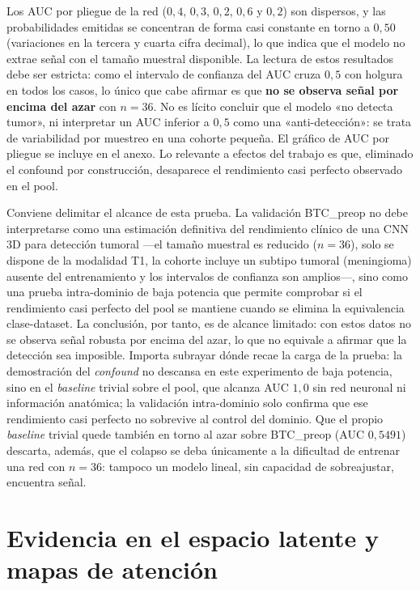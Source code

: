 Los AUC por pliegue de la red ($0{,}4$, $0{,}3$, $0{,}2$, $0{,}6$ y $0{,}2$) son
dispersos, y las probabilidades emitidas se concentran de forma casi constante en
torno a $0{,}50$ (variaciones en la tercera y cuarta cifra decimal), lo que
indica que el modelo no extrae señal con el tamaño muestral disponible. La
lectura de estos resultados debe ser estricta: como el intervalo de confianza
del AUC cruza $0{,}5$ con holgura en todos los casos, lo único que cabe afirmar
es que \textbf{no se observa señal por encima del azar} con $n=36$. No es lícito
concluir que el modelo «no detecta tumor», ni interpretar un AUC inferior a
$0{,}5$ como una «anti-detección»: se trata de variabilidad por muestreo en una
cohorte pequeña. El gráfico de AUC por pliegue se incluye en el anexo. Lo
relevante a efectos del trabajo es que, eliminado el confound por construcción,
desaparece el rendimiento casi perfecto observado en el pool.

Conviene delimitar el alcance de esta prueba. La validación BTC\_preop no debe
interpretarse como una estimación definitiva del rendimiento clínico de una
CNN 3D para detección tumoral ---el tamaño muestral es reducido ($n=36$), solo se
dispone de la modalidad T1, la cohorte incluye un subtipo tumoral (meningioma)
ausente del entrenamiento y los intervalos de confianza son amplios---, sino como
una prueba intra-dominio de baja potencia que permite comprobar si el rendimiento
casi perfecto del pool se mantiene cuando se elimina la equivalencia
clase-dataset. La conclusión, por tanto, es de alcance limitado: con estos datos
no se observa señal robusta por encima del azar, lo que no equivale a afirmar que
la detección sea imposible. Importa subrayar dónde recae la carga de la prueba: la
demostración del \emph{confound} no descansa en este experimento de baja potencia,
sino en el \emph{baseline} trivial sobre el pool, que alcanza AUC $1{,}0$ sin red
neuronal ni información anatómica; la validación intra-dominio solo confirma que ese
rendimiento casi perfecto no sobrevive al control del dominio. Que el propio
\emph{baseline} trivial quede también en torno al azar sobre BTC\_preop
(AUC $0{,}5491$) descarta, además, que el colapso se deba únicamente a la dificultad
de entrenar una red con $n=36$: tampoco un modelo lineal, sin capacidad de
sobreajustar, encuentra señal.

\section{Evidencia en el espacio latente y mapas de atención}
\label{sec:latente}


